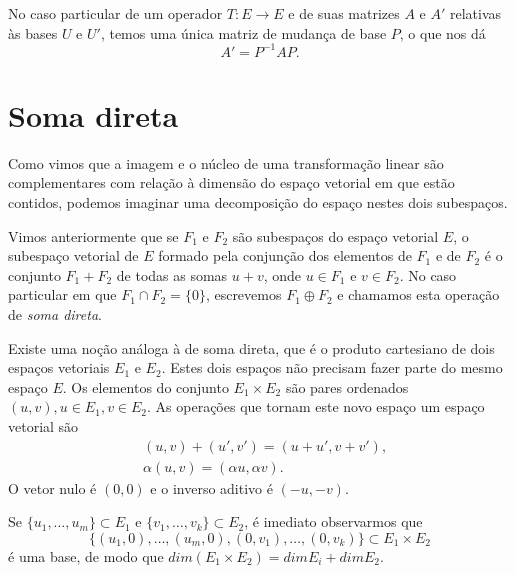No caso particular de um operador $T:E\rightarrow E$ e de suas matrizes $A$ e $A'$ relativas às bases $U$ e $U'$, temos uma única matriz de mudança de base $P$, o que nos dá
\begin{equation*}
  A'=P^{-1}AP.
\end{equation*}

\section{Soma direta}

Como vimos que a imagem e o núcleo de uma transformação linear são complementares com relação à dimensão do espaço vetorial em que estão contidos, podemos imaginar uma decomposição do espaço nestes dois subespaços. 

Vimos anteriormente que se $F_1$ e $F_2$ são subespaços do espaço vetorial $E$, o subespaço vetorial de $E$ formado pela conjunção dos elementos de $F_1$ e de $F_2$  é o conjunto $F_1+F_2$ de todas as somas $u+v$, onde $u\in F_1$ e $v\in F_2$. No caso particular em que $F_1 \cap F_2 = \{ 0\}$, escrevemos $F_1\oplus F_2$ e chamamos esta operação de \emph{soma direta}.

Existe uma noção análoga à de soma direta, que é o produto cartesiano de dois espaços vetoriais $E_1$ e $E_2$. Estes dois espaços não precisam fazer parte do mesmo espaço $E$. Os elementos do conjunto $E_1\times E_2$ são pares ordenados $(u,v), u\in E_1, v\in E_2$. As operações que tornam este novo espaço um espaço vetorial são
\begin{align*}
  &(u,v)+(u',v')=(u+u',v+v'), \\
  &\alpha(u,v)=(\alpha u,\alpha v).
\end{align*}
O vetor nulo é $(0,0)$ e o inverso aditivo é $(-u,-v)$.

Se $\{u_1,\ldots,u_m\} \subset E_1$ e $\{v_1,\ldots,v_k\} \subset E_2$, é imediato observarmos que 
\begin{equation*}
\{(u_1,0),\ldots,(u_m,0),(0,v_1),\ldots,(0,v_k)\}\subset E_1\times E_2
\end{equation*}
é uma base, de modo que $dim(E_1\times E_2) = dim E_i + dim E_2$.

